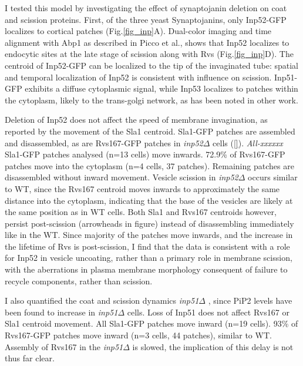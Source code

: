 	
		\vspace{5mm}
		I tested this model by investigating the effect of synaptojanin deletion on coat and scission proteins. First, of the three yeast Synaptojanins, only Inp52-GFP localizes to cortical patches (Fig.\ref{fig_inp}A). Dual-color imaging and time alignment with Abp1 as described in Picco et al., shows that Inp52 localizes to endocytic sites at the late stage of scission along with Rvs (Fig.\ref{fig_inp}D). The centroid of Inp52-GFP can be localized to the tip of the invaginated tube: spatial and temporal localization of Inp52 is consistent with influence on scission. Inp51-GFP exhibits a diffuse cytoplasmic signal, while Inp53 localizes to patches within the cytoplasm, likely to the trans-golgi network, as has been noted in other work. 


		\vspace{5mm}
		Deletion of Inp52 does not affect the speed of membrane invagination, as reported by the movement of the Sla1 centroid. Sla1-GFP patches are assembled and disassembled, as are Rvs167-GFP patches in \textit{inp52$\Delta$ } cells (\ref{}). \textit{All-xxxxxx} Sla1-GFP patches analysed (n=13 cells) move inwards. 72.9\% of Rvs167-GFP patches move into the cytoplasm (n=4 cells, 37 patches). Remaining patches are disassembled without inward movement. Vesicle scission in \textit{inp52$\Delta$ }occurs similar to WT, since the Rvs167 centroid moves inwards to approximately the same distance into the cytoplasm, indicating that the base of the vesicles are likely at the same position as in WT cells. Both Sla1 and Rvs167 centroids however, persist post-scission (arrowheads in figure) instead of disassembling immediately like in the WT. Since majority of the patches move inwards, and the increase in the lifetime of Rvs is post-scission, I find that the data is consistent with a role for Inp52 in vesicle uncoating, rather than a primary role in membrane scission, with the aberrations in plasma membrane morphology consequent of failure to recycle components, rather than scission. 
	


		\vspace{5mm}
		I also quantified the coat and scission dynamics \textit{inp51$\Delta$ }, since PiP2 levels have been found to increase in \textit{inp51$\Delta$ } cells. Loss of Inp51 does not affect Rvs167 or Sla1 centroid movement. All Sla1-GFP patches move inward (n=19 cells). 93\% of Rvs167-GFP patches move inward (n=3 cells, 44 patches), similar to WT. Assembly of Rvs167 in the \textit{inp51$\Delta$ }is slowed, the implication of this delay is not thus far clear. 


